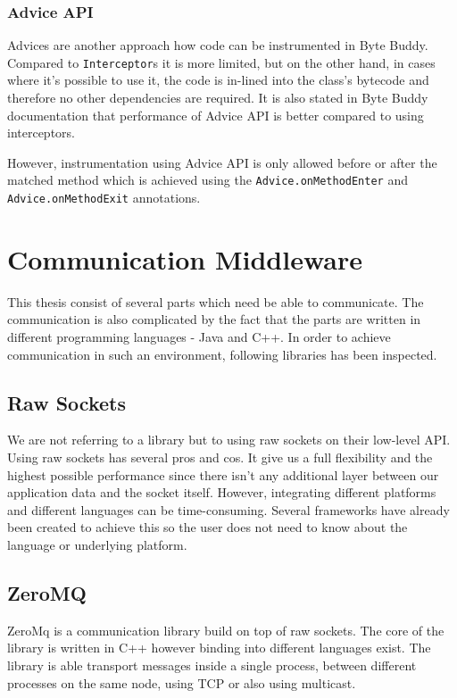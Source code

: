 \subsubsection{Advice API}
Advices are another approach how code can be instrumented in Byte Buddy. Compared to \texttt{Interceptor}s it is more limited, but on the other hand, in cases where it's possible to use it, the code is in-lined into the class's bytecode and therefore no other dependencies are required. It is also stated in Byte Buddy documentation that performance of Advice API is better compared to using interceptors.

However, instrumentation using Advice API is only allowed before or after the matched method which is achieved using the \texttt{Advice.onMethodEnter} and \texttt{Advice.onMethodExit} annotations.

\section{Communication Middleware}
This thesis consist of several parts which need be able to communicate. The communication is also complicated by the fact that the parts are written in different programming languages - Java and C++. In order to achieve communication in such an environment, following libraries has been inspected.
\subsection{Raw Sockets}
We are not referring to a library but to using raw sockets on their low-level API. Using raw sockets has several pros and cos. It give us a full flexibility and the highest possible performance since there isn't any additional layer between our application data and the socket itself. However, integrating different platforms and different languages can be time-consuming. Several frameworks have already been created to achieve this so the user does not need to know about the language or underlying platform.
\subsection{ZeroMQ}
ZeroMq is a communication library build on top of raw sockets. The core of the library is written in C++ however binding into different languages exist. The library is able transport messages inside a single process, between different processes on the same node, using TCP or also using multicast.

